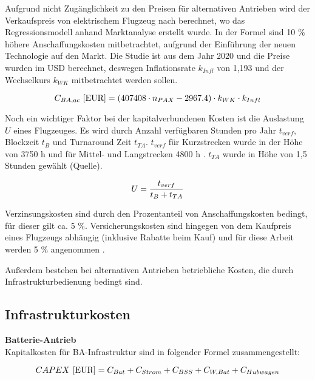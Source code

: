Aufgrund nicht Zugänglichkeit zu den Preisen für alternativen Antrieben wird der Verkaufspreis von elektrischem Flugzeug nach 
\cite{monjon2020conceptual} berechnet, 
wo das Regressionsmodell anhand Marktanalyse erstellt wurde. In der Formel sind 10 \% höhere Anschaffungskosten mitbetrachtet, 
aufgrund der Einführung der neuen Technologie auf den Markt.
Die Studie ist aus dem Jahr 2020 und die Preise wurden im USD berechnet, deswegen Inflationsrate $k_{Infl}$ von 1,193 und
der Wechselkurs $k_{WK}$ mitbetrachtet werden sollen.

\begin{equation}
   {C_{BA,ac} ~[\text{EUR}]} = (407408 \cdot n_{PAX} - 2967.4) \cdot k_{WK} \cdot {k_{Infl}}\\
   \label{price BA}
\end{equation}

Noch ein wichtiger Faktor bei der kapitalverbundenen Kosten ist die Auslastung $U$ eines Flugzeuges. Es wird durch Anzahl 
verfügbaren Stunden pro Jahr $t_{verf}$, Blockzeit $t_B$ und Turnaround Zeit $t_{TA}$. $t_{verf}$ für Kurzstrecken wurde 
in der Höhe von 3750 h und für Mittel- und Langstrecken 4800 h \cite{scholz_design_evaluation_doc}. $t_{TA}$ wurde in Höhe von 1,5
Stunden gewählt (Quelle).

\begin{equation}
   U = \frac{t_{verf}}{t_B + t_{TA}} \\
   \label{utilisation}
\end{equation}

Verzinsungskosten sind durch den Prozentanteil von Anschaffungskosten bedingt, für dieser gilt ca. 5 \%. Versicherungskosten sind 
hingegen von dem Kaufpreis eines Flugzeugs abhängig (inklusive Rabatte beim Kauf) und für diese Arbeit werden 5 \% angenommen 
\cite{scholz_design_evaluation_doc}.

Außerdem bestehen bei alternativen Antrieben betriebliche Kosten, die durch Infrastrukturbedienung bedingt sind.
\subsection{Infrastrukturkosten}

\textbf{Batterie-Antrieb}\\
Kapitalkosten für BA-Infrastruktur sind in folgender Formel zusammengestellt:

\begin{equation}
     {CAPEX ~[\text{EUR}]} = C_{Bat} + C_{Strom} + C_{BSS} + C_{W,Bat} + C_{Hubwagen}\\
     \label{BA_Infrastruktur}
  \end{equation}

